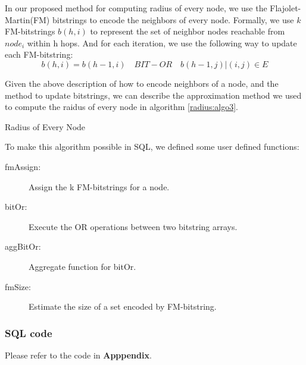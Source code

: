 In our proposed method for computing radius of every node, we use the Flajolet-Martin(FM) bitstrings to encode the neighbors of every node. Formally, we use $k$ FM-bitstrings $b(h, i)$ to represent the set of neighbor nodes reachable from $node_i$ within h hops. And for each iteration, we use the following way to update each FM-bitstring:$$b(h,i) = b(h-1,i)  \quad BIT-OR \quad  {b(h-1,j)|(i,j)\in E}$$

Given the above description of how to encode neighbors of a node, and the method to update bitstrings, we can describe the approximation method we used to compute the raidus of every node in algorithm \ref{radius:algo3}.

\begin{algorithm}
\caption{Radius of Every Node}
\begin{algorithmic}
\REPEAT
{}
\end{algorithmic}
\label{radius:algo3}
\end{algorithm}


To make this algorithm possible in SQL, we defined some user defined functions:
\begin{description}
  \item[fmAssign:] Assign the k FM-bitstrings for a node.
  \item[bitOr:] Execute the OR operations between two bitstring arrays.
  \item[aggBitOr:] Aggregate function for bitOr.
  \item[fmSize:] Estimate the size of a set encoded by FM-bitstring.
\end{description}

\subsubsection{SQL code}
Please refer to the code in {\bf Apppendix}.


